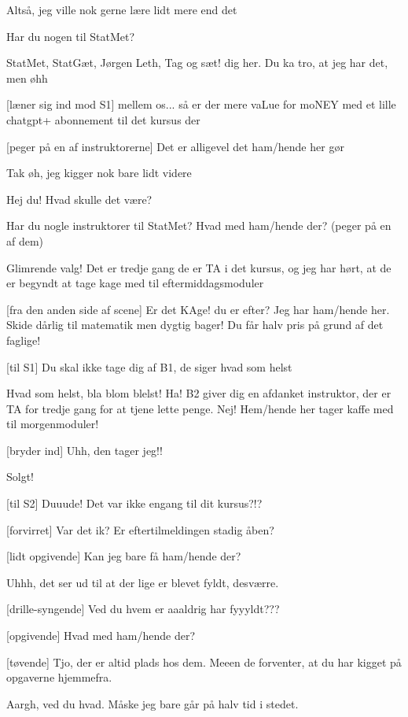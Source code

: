 \documentclass[a4paper,11pt]{article}
\begin{document}
\begin{sketch}
 Altså, jeg ville nok gerne lære lidt mere end det 

 Har du nogen til StatMet?

 StatMet, StatGæt, Jørgen Leth, Tag og sæt! dig her. Du ka tro, at jeg har det, men øhh

[læner sig ind mod S1] mellem os... så er der mere vaLue for moNEY med et lille chatgpt+ abonnement til det kursus der

[peger på en af instruktorerne] Det er alligevel det ham/hende her gør

 Tak øh, jeg kigger nok bare lidt videre


 Hej du! Hvad skulle det være?

 Har du nogle instruktorer til StatMet? Hvad med ham/hende der? (peger på en af dem)

 Glimrende valg! Det er tredje gang de er TA i det kursus, og jeg har hørt, at de er begyndt at tage kage med til eftermiddagsmoduler 

[fra den anden side af scene] Er det KAge! du er efter? Jeg har ham/hende her. Skide dårlig til matematik men dygtig bager! Du får halv pris på grund af det faglige! 

[til S1] Du skal ikke tage dig af B1, de siger hvad som helst

 Hvad som helst, bla blom blelst! Ha! B2 giver dig en afdanket instruktor, der er TA for tredje gang for at tjene lette penge. Nej! Hem/hende her tager kaffe med til morgenmoduler!

[bryder ind] Uhh, den tager jeg!!

 Solgt!

[til S2] Duuude! Det var ikke engang til dit kursus?!?

[forvirret] Var det ik? Er eftertilmeldingen stadig åben?


[lidt opgivende] Kan jeg bare få ham/hende der?

 Uhhh, det ser ud til at der lige er blevet fyldt, desværre. 

[drille-syngende] Ved du hvem er aaaldrig har fyyyldt???


[opgivende] Hvad med ham/hende der?

[tøvende] Tjo, der er altid plads hos dem. Meeen de forventer, at du har kigget på opgaverne hjemmefra.

 Aargh, ved du hvad. Måske jeg bare går på halv tid i stedet.


\end{sketch}
\end{document}
